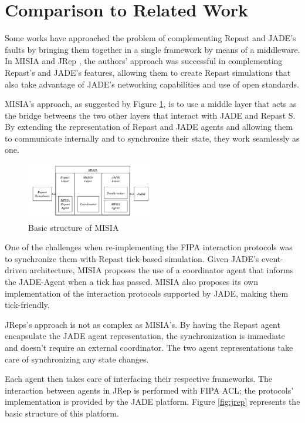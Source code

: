 \section{Comparison to Related Work} %
\label{sec:related_work}

Some works have approached the problem of complementing Repast and JADE's faults by bringing them together in a single framework by means of a middleware. In MISIA \cite{garcia2011misia} and JRep \cite{gormer2011jrep}, the authors' approach was successful in complementing Repast's and JADE's features, allowing them to create Repast simulations that also take advantage of JADE's networking capabilities and use of open standards.

MISIA's approach, as suggested by Figure \ref{fig:misia}, is to use a middle layer that acts as the bridge betweens the two other layers that interact with JADE and Repast S. By extending the representation of Repast and JADE agents and allowing them to communicate internally and to synchronize their state,
they work seamlessly as one.

\begin{figure}[h]
	\centering
	\includegraphics[width=0.5\textwidth]{figures/MISIA.png}
	\caption{Basic structure of MISIA}
	\label{fig:misia}
\end{figure}

One of the challenges when re-implementing the FIPA interaction protocols was to synchronize them with Repast tick-based simulation. Given JADE's event-driven architecture, MISIA proposes the use of a coordinator agent that informs the JADE-Agent when a tick has passed. MISIA also proposes its own implementation of the interaction protocols supported by JADE, making them tick-friendly.

JReps's approach is not as complex as MISIA's. By having the Repast agent encapsulate the JADE agent representation, the synchronization is immediate and doesn't require an external coordinator. The two agent representations take care of synchronizing any state changes.

Each agent then takes care of interfacing their respective frameworks. The interaction between agents in JRep is performed with FIPA ACL; the protocols' implementation is provided by the JADE platform. Figure \ref{fig:jrep} represents the basic structure of this platform.

